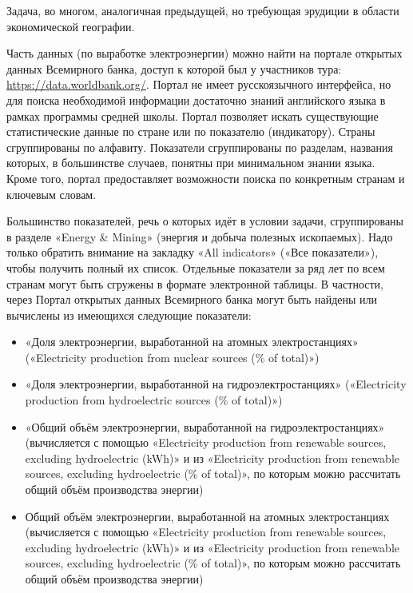 \explanationSection

Задача, во многом, аналогичная предыдущей, но требующая эрудиции в области экономической географии.

Часть данных (по выработке электроэнергии) можно найти на портале открытых данных Всемирного банка, доступ к которой был у участников тура: \url{https://data.worldbank.org/}. Портал не имеет русскоязычного интерфейса, но для поиска необходимой информации достаточно знаний английского языка в рамках программы средней школы. Портал позволяет искать существующие статистические данные по стране или по показателю (индикатору). Страны сгруппированы по алфавиту. Показатели сгруппированы по разделам, названия которых, в большинстве случаев, понятны при минимальном знании языка. Кроме того, портал предоставляет возможности поиска по конкретным странам и ключевым словам.

Большинство показателей, речь о которых идёт в условии задачи, сгруппированы в разделе «Energy \& Mining» (энергия и добыча полезных ископаемых). Надо только обратить внимание на закладку «All indicators» («Все показатели»), чтобы получить полный их список. Отдельные показатели за ряд лет по всем странам могут быть сгружены в формате электронной таблицы. В частности, через Портал открытых данных Всемирного банка могут быть найдены или вычислены из имеющихся следующие показатели:
\begin{itemize}
    \item «Доля электроэнергии, выработанной на атомных электростанциях»
(«Electricity production from nuclear sources (\% of total)»)
    \item «Доля электроэнергии, выработанной на гидроэлектростанциях»
(«Electricity production from hydroelectric sources (\% of total)»)
    \item «Общий объём электроэнергии, выработанной на гидроэлектростанциях»
(вычисляется с помощью «Electricity production from renewable sources, excluding hydroelectric (kWh)» и из «Electricity production from renewable sources, excluding hydroelectric (\% of total)», по которым можно рассчитать общий объём производства энергии)
    \item Общий объём электроэнергии, выработанной на атомных электростанциях
(вычисляется с помощью «Electricity production from renewable sources, excluding hydroelectric (kWh)» и из «Electricity production from renewable sources, excluding hydroelectric (\% of total)», по которым можно рассчитать общий объём производства энергии)
\end{itemize}

